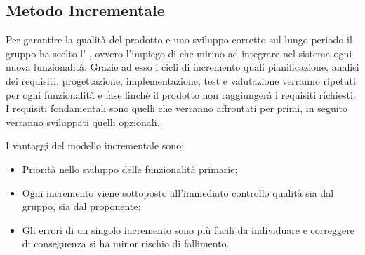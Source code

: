 \documentclass[../piano_di_progetto.tex]{subfiles}
\begin{document}
\subsection{Metodo Incrementale}
\label{sub:incr}

Per garantire la qualità del prodotto e uno sviluppo corretto sul lungo periodo il gruppo ha scelto l’ , ovvero l'impiego di  che mirino ad integrare nel sistema ogni nuova funzionalità. Grazie ad esso i cicli di incremento quali pianificazione, analisi dei requisiti, progettazione, implementazione, test e valutazione verranno ripetuti per ogni funzionalità e fase finchè il prodotto non raggiungerà i requisiti richiesti. I requisiti fondamentali sono quelli che verranno affrontati per primi, in seguito verranno sviluppati quelli opzionali.

I vantaggi del modello incrementale sono:
\begin{itemize}
    \item Priorità nello sviluppo delle funzionalità primarie;
    \item Ogni incremento viene sottoposto all’immediato controllo qualità sia dal gruppo, sia dal proponente;
    \item Gli errori di un singolo incremento sono più facili da individuare e correggere di conseguenza si ha minor rischio di fallimento.
\end{itemize}
\end{document}
